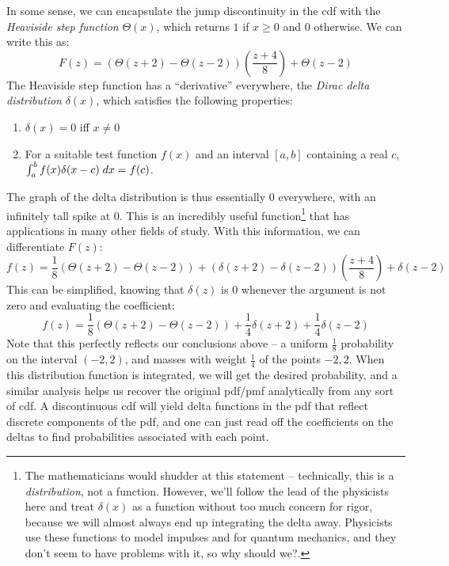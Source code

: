 \documentclass[../main.tex]{subfiles}
\begin{document}
\begin{remark}
    In some sense, we can encapsulate the jump discontinuity in the cdf with the \textit{Heaviside step function} $\Theta(x)$, which returns $1$ if $x\geq 0$ and $0$ otherwise. We can write this as: 
    \[
        F(z) = (\Theta(z+2) - \Theta(z-2))\left(\frac{z+4}{8}\right) + \Theta(z-2)
    \]
    The Heaviside step function has a ``derivative'' everywhere, the \textit{Dirac delta distribution} $\delta(x)$, which satisfies the following properties: 
    \begin{enumerate}
        \item $\delta(x) = 0$ iff $x \neq 0$
        \item For a suitable test function $f(x)$ and an interval $[a,b]$ containing a real $c$, $\int_a^b f(x) \delta(x-c) \;dx = f(c)$. 
    \end{enumerate}
    The graph of the delta distribution is thus essentially 0 everywhere, with an infinitely tall spike at 0. This is an incredibly useful function\footnote{The mathematicians would shudder at this statement -- technically, this is a \textit{distribution}, not a function. However, we'll follow the lead of the physicists here and treat $\delta(x)$ as a function without too much concern for rigor, because we will almost always end up integrating the delta away. Physicists use these functions to model impulses and for quantum mechanics, and they don't seem to have problems with it, so why should we?.} that has applications in many other fields of study. With this information, we can differentiate $F(z)$: 
    \[
        f(z) = \frac 18 (\Theta(z+2) - \Theta(z-2)) + (\delta(z+2) - \delta(z-2))\left(\frac{z+4}{8}\right) + \delta(z-2) 
    \]
    This can be simplified, knowing that $\delta(z)$ is 0 whenever the argument is not zero and evaluating the coefficient: 
    \[
        f(z) = \frac 18 (\Theta(z+2) - \Theta(z-2)) + \frac 14 \delta(z+2) + \frac 14  \delta(z-2)
    \]
    Note that this perfectly reflects our conclusions above -- a uniform $\frac 18$ probability on the interval $(-2, 2)$, and masses with weight $\frac 14$ of the points $-2, 2$. When this distribution function is integrated, we will get the desired probability, and a similar analysis helps us recover the original pdf/pmf analytically from any sort of cdf. A discontinuous cdf will yield delta functions in the pdf that reflect discrete components of the pdf, and one can just read off the coefficients on the deltas to find probabilities associated with each point. 
\end{remark}
\end{document}
